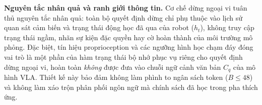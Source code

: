 \textbf{Nguyên tắc nhân quả và ranh giới thông tin.} Cơ chế dừng ngoại vi tuân thủ nguyên tắc nhân quả: toàn bộ quyết định dừng chỉ phụ thuộc vào lịch sử quan sát cảm biến và trạng thái động học đã qua của robot ($h_t$), không truy cập trạng thái ngầm, nhãn sự kiện đặc quyền hay cờ hoàn thành của môi trường mô phỏng. Đặc biệt, tín hiệu proprioception và các ngưỡng hình học chạm đáy đóng vai trò là một phần của hàm trạng thái bộ nhớ phục vụ riêng cho quyết định dừng ngoại vi, hoàn toàn \textit{không} được đưa vào chuỗi ngữ cảnh văn bản $C_q$ của mô hình VLA. Thiết kế này bảo đảm không làm phình to ngân sách token ($B \le 48$) và không làm xáo trộn phân phối ngôn ngữ mà chính sách đã học trong pha thích ứng.
